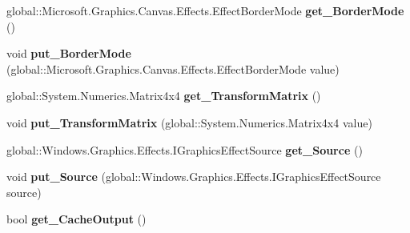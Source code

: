 \begin{DoxyCompactItemize}
global\+::\+Microsoft.\+Graphics.\+Canvas.\+Effects.\+Effect\+Border\+Mode {\bfseries get\+\_\+\+Border\+Mode} ()
\item 
\mbox{\label{class_microsoft_1_1_graphics_1_1_canvas_1_1_effects_1_1_transform3_d_effect_a8f41e3d39b88ba94f977519171bf2446}} 
void {\bfseries put\+\_\+\+Border\+Mode} (global\+::\+Microsoft.\+Graphics.\+Canvas.\+Effects.\+Effect\+Border\+Mode value)
\item 
\mbox{\label{class_microsoft_1_1_graphics_1_1_canvas_1_1_effects_1_1_transform3_d_effect_aa80b16ff5d14dca3bcbf428286d5496c}} 
global\+::\+System.\+Numerics.\+Matrix4x4 {\bfseries get\+\_\+\+Transform\+Matrix} ()
\item 
\mbox{\label{class_microsoft_1_1_graphics_1_1_canvas_1_1_effects_1_1_transform3_d_effect_a1a29836c35514b1d6cf8834255c05da7}} 
void {\bfseries put\+\_\+\+Transform\+Matrix} (global\+::\+System.\+Numerics.\+Matrix4x4 value)
\item 
\mbox{\label{class_microsoft_1_1_graphics_1_1_canvas_1_1_effects_1_1_transform3_d_effect_aabf75189a0a2858c19e9e0c431ee3e81}} 
global\+::\+Windows.\+Graphics.\+Effects.\+I\+Graphics\+Effect\+Source {\bfseries get\+\_\+\+Source} ()
\item 
\mbox{\label{class_microsoft_1_1_graphics_1_1_canvas_1_1_effects_1_1_transform3_d_effect_a50774a6e92f54c773522cbc57e44ffbf}} 
void {\bfseries put\+\_\+\+Source} (global\+::\+Windows.\+Graphics.\+Effects.\+I\+Graphics\+Effect\+Source source)
\item 
\mbox{\label{class_microsoft_1_1_graphics_1_1_canvas_1_1_effects_1_1_transform3_d_effect_a6fd6a7212abf3fb015bcb55d184efbdf}} 
bool {\bfseries get\+\_\+\+Cache\+Output} ()
\item 
\mbox{\label{class_microsoft_1_1_graphics_1_1_canvas_1_1_effects_1_1_transform3_d_effect_a5f76a4f696cc8f4c885a255b03199352}} 

\end{DoxyCompactItemize}
